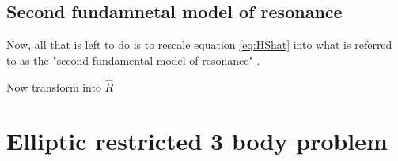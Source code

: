 \documentclass[usenatbib]{mnras}
\newcommand{\note}[1]{{\color{red} \large #1 }}
\begin{document}
\subsection{Second fundamnetal model of resonance}
\label{sec:orgefbe099}
Now, all that is left to do is to rescale equation \eqref{eq:HShat}
into what is referred to as
the "second fundamental model of resonance" \citep{henrard_second_1983}.



\note{
Now transform into $\hat R$
}


\section{Elliptic restricted 3 body problem}
\label{sec:org6e53fa0}

\twocolumn


\end{document}
